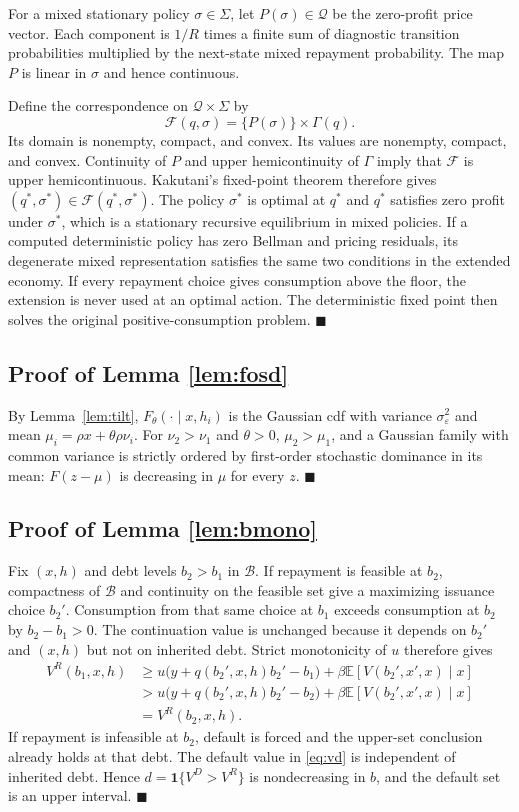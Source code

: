 \documentclass[11pt]{article}
\theoremstyle{definition}
\newcommand{\E}{\mathbb{E}}
\newcommand{\one}{\mathbf{1}}
\begin{document}
For a mixed stationary policy $\sigma\in\Sigma$, let $P(\sigma)\in\mathcal Q$ be the zero-profit price vector. Each component is $1/R$ times a finite sum of diagnostic transition probabilities multiplied by the next-state mixed repayment probability. The map $P$ is linear in $\sigma$ and hence continuous.

Define the correspondence on $\mathcal Q\times\Sigma$ by
\[
\mathcal F(q,\sigma)=\{P(\sigma)\}\times\Gamma(q).
\]
Its domain is nonempty, compact, and convex. Its values are nonempty, compact, and convex. Continuity of $P$ and upper hemicontinuity of $\Gamma$ imply that $\mathcal F$ is upper hemicontinuous. Kakutani's fixed-point theorem therefore gives $(q^*,\sigma^*)\in\mathcal F(q^*,\sigma^*)$. The policy $\sigma^*$ is optimal at $q^*$ and $q^*$ satisfies zero profit under $\sigma^*$, which is a stationary recursive equilibrium in mixed policies. If a computed deterministic policy has zero Bellman and pricing residuals, its degenerate mixed representation satisfies the same two conditions in the extended economy. If every repayment choice gives consumption above the floor, the extension is never used at an optimal action. The deterministic fixed point then solves the original positive-consumption problem. $\blacksquare$

\subsection{Proof of Lemma \ref{lem:fosd}}
By Lemma~\ref{lem:tilt}, $F_\theta(\cdot \mid x, h_i)$ is the Gaussian cdf with variance $\sigma_\varepsilon^2$ and mean $\mu_i = \rho x + \theta \rho \nu_i$. For $\nu_2 > \nu_1$ and $\theta > 0$, $\mu_2 > \mu_1$, and a Gaussian family with common variance is strictly ordered by first-order stochastic dominance in its mean: $F(z - \mu)$ is decreasing in $\mu$ for every $z$. $\blacksquare$

\subsection{Proof of Lemma \ref{lem:bmono}}
Fix $(x,h)$ and debt levels $b_2>b_1$ in $\mathcal B$. If repayment is feasible at $b_2$, compactness of $\mathcal B$ and continuity on the feasible set give a maximizing issuance choice $b_2'$. Consumption from that same choice at $b_1$ exceeds consumption at $b_2$ by $b_2-b_1>0$. The continuation value is unchanged because it depends on $b_2'$ and $(x,h)$ but not on inherited debt. Strict monotonicity of $u$ therefore gives
\[
\begin{aligned}
V^R(b_1,x,h)
&\geq u\big(y+q(b_2',x,h)b_2'-b_1\big)
  +\beta\E[V(b_2',x',x)\mid x]\\
&>u\big(y+q(b_2',x,h)b_2'-b_2\big)
  +\beta\E[V(b_2',x',x)\mid x]\\
&=V^R(b_2,x,h).
\end{aligned}
\]
If repayment is infeasible at $b_2$, default is forced and the upper-set conclusion already holds at that debt. The default value in \eqref{eq:vd} is independent of inherited debt. Hence $d=\one\{V^D>V^R\}$ is nondecreasing in $b$, and the default set is an upper interval. $\blacksquare$
\end{document}
